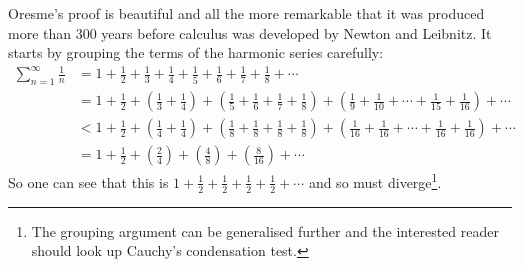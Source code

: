 Oresme's proof is beautiful and all the more remarkable that it was
produced more than 300 years before calculus was developed by Newton
and Leibnitz. It starts by grouping the terms of the harmonic series
carefully:
\begin{align*}
  \sum_{n=1}^\infty \frac{1}{n}
  &= 1 + \frac{1}{2} + \frac{1}{3} + \frac{1}{4} + \frac{1}{5} + \frac{1}{6} + \frac{1}{7} + \frac{1}{8} + \cdots \\
  &= 1 + \frac{1}{2}
  + \left( \frac{1}{3} + \frac{1}{4} \right)
  + \left( \frac{1}{5} + \frac{1}{6} + \frac{1}{7} + \frac{1}{8} \right)
  + \left( \frac{1}{9} + \frac{1}{10} + \cdots + \frac{1}{15} + \frac{1}{16} \right)
  + \cdots \\
  &< 1 + \frac{1}{2}
  + \left( \frac{1}{4} + \frac{1}{4} \right)
  + \left( \frac{1}{8} + \frac{1}{8} + \frac{1}{8} + \frac{1}{8} \right)
  + \left( \frac{1}{16} + \frac{1}{16} + \cdots + \frac{1}{16} + \frac{1}{16} \right)
  + \cdots
  \\
  &= 1 + \frac{1}{2} + \left( \frac{2}{4} \right) + \left( \frac{4}{8}  \right)
       + \left( \frac{8}{16}  \right) + \cdots
\end{align*}
So one can see that this is $1 + \frac{1}{2} +\frac{1}{2}+\frac{1}{2}
+\frac{1}{2} +\cdots$ and so must diverge\footnote{%
The grouping argument can be generalised further and the interested reader should look up Cauchy's condensation test.
}.



